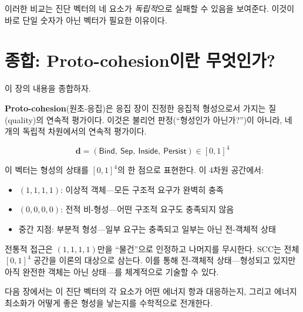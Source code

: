 이러한 비교는 진단 벡터의 네 요소가 \emph{독립적}으로 실패할 수 있음을 보여준다. 이것이 바로 단일 숫자가 아닌 벡터가 필요한 이유이다.


\section{종합: Proto-cohesion이란 무엇인가?}
\label{sec:synthesis}

이 장의 내용을 종합하자.

\textbf{Proto-cohesion}(원초-응집)은 응집 장이 진정한 응집적 형성으로서 가지는 질(quality)의 연속적 평가이다. 이것은 불리언 판정(``형성인가 아닌가?'')이 아니라, 네 개의 독립적 차원에서의 연속적 평가이다.

\begin{equation}
    \mathbf{d} = (\mathsf{Bind},\ \mathsf{Sep},\ \mathsf{Inside},\ \mathsf{Persist}) \in [0,1]^4
\end{equation}

이 벡터는 형성의 상태를 $[0,1]^4$의 한 점으로 표현한다. 이 4차원 공간에서:
\begin{itemize}
    \item $(1, 1, 1, 1)$: 이상적 객체---모든 구조적 요구가 완벽히 충족
    \item $(0, 0, 0, 0)$: 전적 비-형성---어떤 구조적 요구도 충족되지 않음
    \item 중간 지점: 부분적 형성---일부 요구는 충족되고 일부는 아닌 전-객체적 상태
\end{itemize}

전통적 접근은 $(1,1,1,1)$만을 ``물건''으로 인정하고 나머지를 무시한다. SCC는 전체 $[0,1]^4$ 공간을 이론의 대상으로 삼는다. 이를 통해 전-객체적 상태---형성되고 있지만 아직 완전한 객체는 아닌 상태---를 체계적으로 기술할 수 있다.

\begin{center}
\end{center}

\bigskip

다음 장에서는 이 진단 벡터의 각 요소가 어떤 에너지 항과 대응하는지, 그리고 에너지 최소화가 어떻게 좋은 형성을 낳는지를 수학적으로 전개한다.
